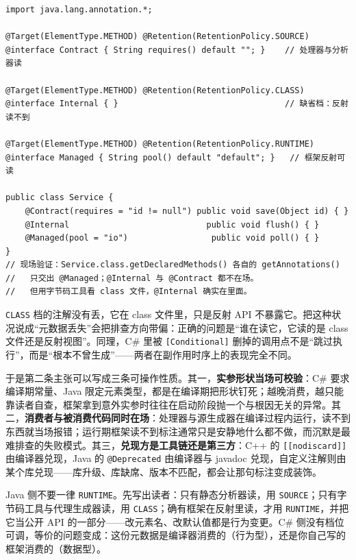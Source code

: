 \documentclass[12pt,a4paper,fontset=fandol]{ctexbook}
\newcommand{\javalabel}{%
  \tcbox[on line,colback=javaheadbg,colframe=javaheadbg,
    boxrule=0pt,arc=1pt,left=2pt,right=2pt,top=1pt,bottom=1pt,
    colupper=white,fontupper=\scriptsize\bfseries]{Java}}
\newcommand{\cpp}[1]{C++#1}
\begin{document}
\javalabel
\begin{lstlisting}[style=javastyle,caption={三档保留策略的可见性差异：一个源文件，三处声明，三个读者},label={lst:ch3-java-retention}]
import java.lang.annotation.*;

@Target(ElementType.METHOD) @Retention(RetentionPolicy.SOURCE)
@interface Contract { String requires() default ""; }    // 处理器与分析器读

@Target(ElementType.METHOD) @Retention(RetentionPolicy.CLASS)
@interface Internal { }                                  // 缺省档：反射读不到

@Target(ElementType.METHOD) @Retention(RetentionPolicy.RUNTIME)
@interface Managed { String pool() default "default"; }   // 框架反射可读

public class Service {
    @Contract(requires = "id != null") public void save(Object id) { }
    @Internal                            public void flush() { }
    @Managed(pool = "io")                 public void poll() { }
}
// 现场验证：Service.class.getDeclaredMethods() 各自的 getAnnotations()
//   只交出 @Managed；@Internal 与 @Contract 都不在场。
//   但用字节码工具看 class 文件，@Internal 确实在里面。
\end{lstlisting}

\begin{warning}[title={“反射读不到”与“信息丢了”是两件事}]
\texttt{CLASS} 档的注解没有丢，它在 class 文件里，只是反射 API 不暴露它。把这种状况说成“元数据丢失”会把排查方向带偏：正确的问题是“谁在读它，它读的是 class 文件还是反射视图”。同理，C\# 里被 \texttt{[Conditional]} 删掉的调用点不是“跳过执行”，而是“根本不曾生成”——两者在副作用时序上的表现完全不同。
\end{warning}

于是第二条主张可以写成三条可操作性质。其一，\textbf{实参形状当场可校验}：C\# 要求编译期常量、Java 限定元素类型，都是在编译期把形状钉死；越晚消费，越只能靠读者自查，框架拿到意外实参时往往在启动阶段抛一个与根因无关的异常。其二，\textbf{消费者与被消费代码同时在场}：处理器与源生成器在编译过程内运行，读不到东西就当场报错；运行期框架读不到标注通常只是安静地什么都不做，而沉默是最难排查的失败模式。其三，\textbf{兑现方是工具链还是第三方}：\cpp{} 的 \texttt{[[nodiscard]]} 由编译器兑现，Java 的 \texttt{@Deprecated} 由编译器与 javadoc 兑现，自定义注解则由某个库兑现——库升级、库缺席、版本不匹配，都会让那句标注变成装饰。

\begin{bestpractice}[title={把保留策略当接口契约来定}]
Java 侧不要一律 \texttt{RUNTIME}。先写出读者：只有静态分析器读，用 \texttt{SOURCE}；只有字节码工具与代理生成器读，用 \texttt{CLASS}；确有框架在反射里读，才用 \texttt{RUNTIME}，并把它当公开 API 的一部分——改元素名、改默认值都是行为变更。C\# 侧没有档位可调，等价的问题变成：这份元数据是编译器消费的（行为型），还是你自己写的框架消费的（数据型）。
\end{bestpractice}
\end{document}
